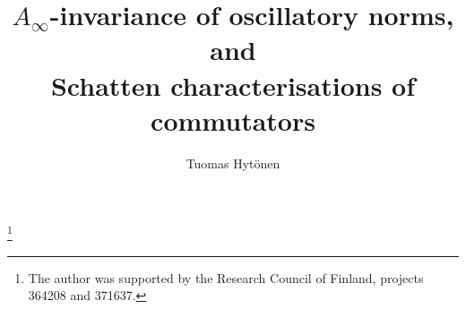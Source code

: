 \documentclass[reqno]{amsart}
\theoremstyle{plain}
\theoremstyle{definition}
\theoremstyle{remark}
\begin{document}
\title[Schatten characterisations of commutators]{$A_\infty$-invariance of oscillatory norms, and\\ Schatten characterisations of commutators}


\author{Tuomas Hyt\"onen}
\address{Aalto University,
Department of Mathematics and Systems Analysis,
P.O. Box 11100, FI-00076 Aalto, Finland}

\thanks{The author was supported by the Research Council of Finland, projects 364208 and 371637.}







\end{document}
